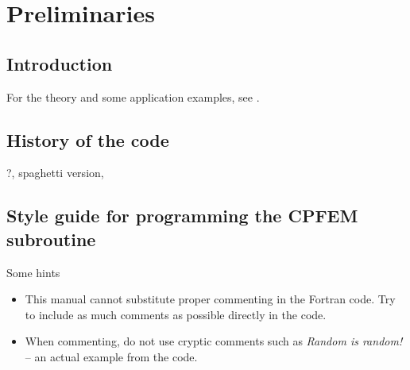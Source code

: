 \chapter{Preliminaries}

\section{Introduction}
For the theory and some application examples, see \citet{Roters2010}.

\section{History of the code}
?, spaghetti version, 




\section{Style guide for programming the CPFEM subroutine}

Some hints
\begin{itemize}
  \item This manual cannot substitute proper commenting in the Fortran code. Try to include as much comments as possible directly in the code. 
  \item When commenting, do not use cryptic comments such as \emph{Random is random!} -- an actual example from the code. 
\end{itemize}

